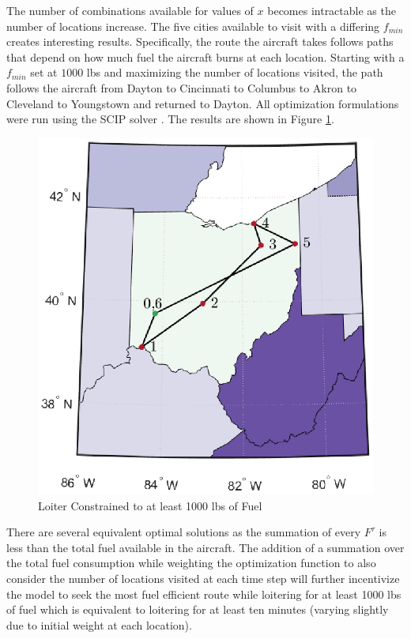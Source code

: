 The number of combinations available for values of $x$ becomes intractable as the number of locations increase. The five cities available to visit with a differing $f_{min}$ creates interesting results. Specifically, the route the aircraft takes follows paths that depend on how much fuel the aircraft burns at each location. Starting with a $f_{min}$ set at $1000$ lbs and maximizing the number of locations visited, the path follows the aircraft from Dayton to Cincinnati to Columbus to Akron to Cleveland to Youngstown and returned to Dayton. All optimization formulations were run using the SCIP solver \cite{scip}. The results are shown in Figure \ref{fig:fmin1000}.
\begin{figure}[h]
    \centering
    \includegraphics{Thesis/Method_II/fmin1000.eps}
    \caption{Loiter Constrained to at least 1000 lbs of Fuel}
    \label{fig:fmin1000}
\end{figure}
There are several equivalent optimal solutions as the summation of every $F^\tau$ is less than the total fuel available in the aircraft. The addition of a summation over the total fuel consumption while weighting the optimization function to also consider the number of locations visited at each time step will further incentivize the model to seek the most fuel efficient route while loitering for at least 1000 lbs of fuel which is equivalent to loitering for at least ten minutes (varying slightly due to initial weight at each location).\par
